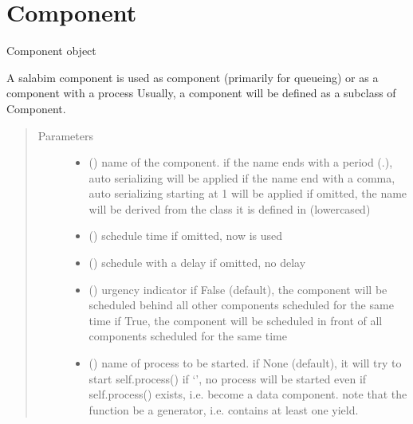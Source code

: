 \documentclass[letterpaper,10pt,english]{sphinxmanual}
\begin{document}
\section{Component}
\label{\detokenize{Reference:component}}

\begin{fulllineitems}
\label{\detokenize{Reference:salabim.Component}}
Component object

A salabim component is used as component (primarily for queueing)
or as a component with a process 
Usually, a component will be defined as a subclass of Component.
\begin{quote}\begin{description}
\item[{Parameters}] \leavevmode\begin{itemize}
\item {} 
 () \textendash{} name of the component. 
if the name ends with a period (.),
auto serializing will be applied 
if the name end with a comma,
auto serializing starting at 1 will be applied 
if omitted, the name will be derived from the class
it is defined in (lowercased)

\item {} 
 () \textendash{} schedule time 
if omitted, now is used

\item {} 
 () \textendash{} schedule with a delay 
if omitted, no delay

\item {} 
 () \textendash{} urgency indicator 
if False (default), the component will be scheduled
behind all other components scheduled
for the same time 
if True, the component will be scheduled
in front of all components scheduled
for the same time

\item {} 
 () \textendash{} name of process to be started. 
if None (default), it will try to start self.process() 
if ‘’, no process will be started even if self.process() exists,
i.e. become a data component. 
note that the function  be a generator,
i.e. contains at least one yield.


\end{itemize}
\end{description}
\end{quote}
\end{fulllineitems}
\end{document}
